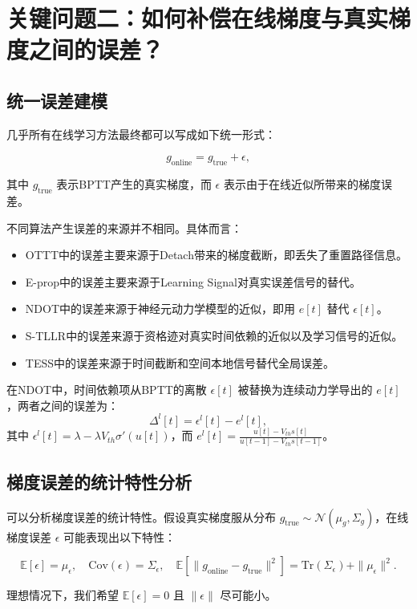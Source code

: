 \documentclass[journal,12pt,onecolumn]{IEEEtran}
\begin{document}
\section{关键问题二：如何补偿在线梯度与真实梯度之间的误差？}

\subsection{统一误差建模}

几乎所有在线学习方法最终都可以写成如下统一形式：

\[
\boxed{
g_{\mathrm{online}} = g_{\mathrm{true}} + \epsilon,
}
\]

其中 \(g_{\mathrm{true}}\) 表示BPTT产生的真实梯度，而 \(\epsilon\) 表示由于在线近似所带来的梯度误差。

不同算法产生误差的来源并不相同。具体而言：
\begin{itemize}
    \item OTTT中的误差主要来源于Detach带来的梯度截断，即丢失了重置路径信息。
    \item E-prop中的误差主要来源于Learning Signal对真实误差信号的替代。
    \item NDOT中的误差来源于神经元动力学模型的近似，即用 \(e[t]\) 替代 \(\epsilon[t]\)。
    \item S-TLLR中的误差来源于资格迹对真实时间依赖的近似以及学习信号的近似。
    \item TESS中的误差来源于时间截断和空间本地信号替代全局误差。
\end{itemize}

在NDOT中，时间依赖项从BPTT的离散 \(\epsilon[t]\) 被替换为连续动力学导出的 \(e[t]\)，两者之间的误差为：
\[
\Delta^l[t] = \epsilon^l[t] - e^l[t],
\]
其中 \(\epsilon^l[t] = \lambda - \lambda V_{th}\sigma'(u[t])\)，而 \(e^l[t] = \frac{u[t] - V_{th}s[t]}{u[t-1] - V_{th}s[t-1]}\)。

\subsection{梯度误差的统计特性分析}

可以分析梯度误差的统计特性。假设真实梯度服从分布 \(g_{\text{true}} \sim \mathcal{N}(\mu_g, \Sigma_g)\)，在线梯度误差 \(\epsilon\) 可能表现出以下特性：

\[
\mathbb{E}[\epsilon] = \mu_\epsilon, \quad \text{Cov}(\epsilon) = \Sigma_\epsilon, \quad \mathbb{E}[\|g_{\text{online}} - g_{\text{true}}\|^2] = \text{Tr}(\Sigma_\epsilon) + \|\mu_\epsilon\|^2.
\]

理想情况下，我们希望 \(\mathbb{E}[\epsilon] = 0\) 且 \(\|\epsilon\|\) 尽可能小。
\end{document}

